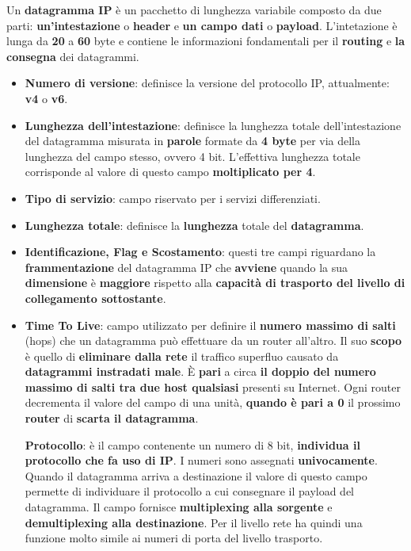 \documentclass[11pt,a4paper,oneside]{book}
\theoremstyle{definition}
\begin{document}
Un \textbf{datagramma IP} è un pacchetto di lunghezza variabile composto da due parti: \textbf{un'intestazione} o \textbf{header} e \textbf{un campo dati} o \textbf{payload}.
L'intetazione è lunga da \textbf{20} a \textbf{60} byte e contiene le informazioni fondamentali per il \textbf{routing} e \textbf{la consegna} dei datagrammi.
\begin{itemize}
	\item \textbf{Numero di versione}: definisce la versione del protocollo IP, attualmente: \textbf{v4} o \textbf{v6}.
	\item \textbf{Lunghezza dell'intestazione}: definisce la lunghezza totale dell'intestazione del datagramma misurata in \textbf{parole} formate da \textbf{4 byte} per via della lunghezza del campo stesso, ovvero 4 bit. L'effettiva lunghezza totale corrisponde al valore di questo campo \textbf{moltiplicato per 4}.
	\item \textbf{Tipo di servizio}: campo riservato per i servizi differenziati.
	\item \textbf{Lunghezza totale}: definisce la \textbf{lunghezza} totale del \textbf{datagramma}.
	\item \textbf{Identificazione, Flag e Scostamento}: questi tre campi riguardano la \textbf{frammentazione} del datagramma IP che \textbf{avviene} quando la sua  \textbf{dimensione} è \textbf{maggiore} rispetto alla \textbf{capacità di trasporto del livello di collegamento sottostante}.
	\item \textbf{Time To Live}: campo utilizzato per definire il \textbf{numero massimo di salti} (hops) che un datagramma può effettuare da un router all'altro. Il suo \textbf{scopo} è quello di \textbf{eliminare dalla rete} il traffico superfluo causato da \textbf{datagrammi instradati male}. È \textbf{pari} a circa \textbf{il doppio del numero massimo di salti tra due host qualsiasi} presenti su Internet. Ogni router decrementa il valore del campo di una unità, \textbf{quando è pari a 0} il prossimo \textbf{router} di \textbf{scarta il datagramma}.

	      \pagebreak

	      \textbf{Protocollo}: è il campo contenente un numero di 8 bit, \textbf{individua il protocollo che fa uso di IP}. I numeri sono assegnati \textbf{univocamente}. Quando il datagramma arriva a destinazione il valore di questo campo permette di individuare il protocollo a cui consegnare il payload del datagramma. Il campo fornisce \textbf{multiplexing alla sorgente} e \textbf{demultiplexing alla destinazione}. Per il livello rete ha quindi una funzione molto simile ai numeri di porta del livello trasporto.


\end{itemize}
\end{document}
